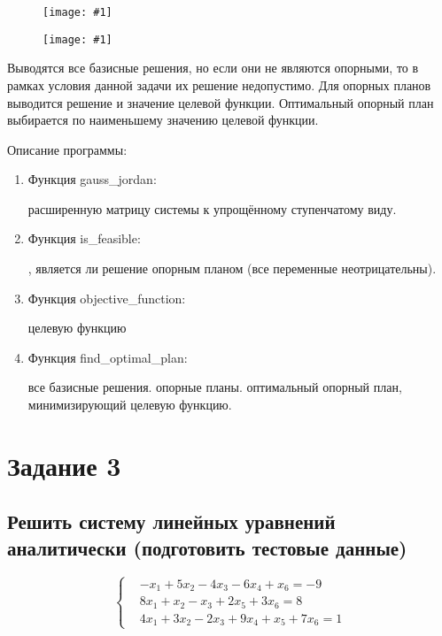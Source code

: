 \documentclass{report}
\newcommand{\drawzalupa}[2]{
	\begin{figure}[H]
		\centering
		\texttt{[image: \#1]}
	\end{figure}
}
\begin{document}
	\drawzalupa{images/task21.png}{0.9}
	
	\drawzalupa{images/task22.png}{0.9}
	
	Выводятся все базисные решения, но если они не являются опорными, то в рамках условия данной задачи их решение недопустимо. Для опорных планов выводится решение и значение целевой функции. Оптимальный опорный план выбирается по наименьшему значению целевой функции.	
	
	
	Описание программы:
	
	\begin{enumerate}
		\item{Функция gauss\_jordan:}
		\begin{itemize}
			 расширенную матрицу системы к упрощённому ступенчатому виду.
		\end{itemize}
		\item{Функция is\_feasible:}
		\begin{itemize}
			, является ли решение опорным планом (все переменные неотрицательны).
		\end{itemize}
		\item{Функция objective\_function:}
		\begin{itemize}
			 целевую функцию
		\end{itemize}
		\item{Функция find\_optimal\_plan:}
		\begin{itemize}
			 все базисные решения.
			 опорные планы.
			 оптимальный опорный план, минимизирующий целевую функцию.
		\end{itemize}
	\end{enumerate}
	
	\chapter{Задание 3}
	
	\section{Решить систему линейных уравнений аналитически (подготовить
		тестовые данные)}
	
\[
\left\{
\begin{aligned}
	&-x_1 + 5x_2 - 4x_3 - 6x_4 + x_6 = -9 \\
	&8x_1 + x_2 - x_3 + 2x_5 + 3x_6 = 8 \\
	&4x_1 + 3x_2 - 2x_3 + 9x_4 + x_5 + 7x_6 = 1
\end{aligned}
\right.
\]
\end{document}
